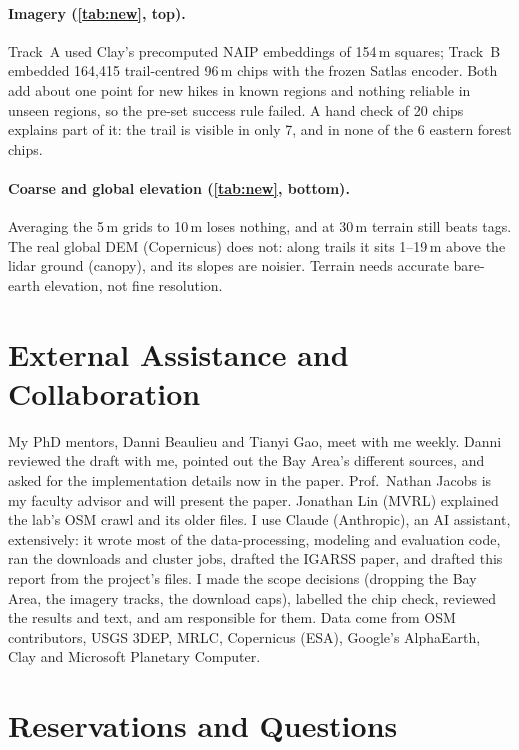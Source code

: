 \documentclass[10pt,twocolumn,letterpaper]{article}
\begin{document}
\paragraph{Imagery (\cref{tab:new}, top).} Track~A used Clay's precomputed NAIP embeddings of 154\,m squares; Track~B embedded 164{,}415 trail-centred 96\,m chips with the frozen Satlas encoder. Both add about one point for new hikes in known regions and nothing reliable in unseen regions, so the pre-set success rule failed. A hand check of 20 chips explains part of it: the trail is visible in only 7, and in none of the 6 eastern forest chips.

\paragraph{Coarse and global elevation (\cref{tab:new}, bottom).} Averaging the 5\,m grids to 10\,m loses nothing, and at 30\,m terrain still beats tags. The real global DEM (Copernicus) does not: along trails it sits 1--19\,m above the lidar ground (canopy), and its slopes are noisier. Terrain needs accurate bare-earth elevation, not fine resolution.

\section{External Assistance and Collaboration}
\label{sec:help}

My PhD mentors, Danni Beaulieu and Tianyi Gao, meet with me weekly. Danni reviewed the draft with me, pointed out the Bay Area's different sources, and asked for the implementation details now in the paper. Prof.\ Nathan Jacobs is my faculty advisor and will present the paper. Jonathan Lin (MVRL) explained the lab's OSM crawl and its older files. I use Claude (Anthropic), an AI assistant, extensively: it wrote most of the data-processing, modeling and evaluation code, ran the downloads and cluster jobs, drafted the IGARSS paper, and drafted this report from the project's files. I made the scope decisions (dropping the Bay Area, the imagery tracks, the download caps), labelled the chip check, reviewed the results and text, and am responsible for them. Data come from OSM contributors, USGS 3DEP, MRLC, Copernicus (ESA), Google's AlphaEarth, Clay and Microsoft Planetary Computer.

\section{Reservations and Questions}
\label{sec:questions}
\end{document}

